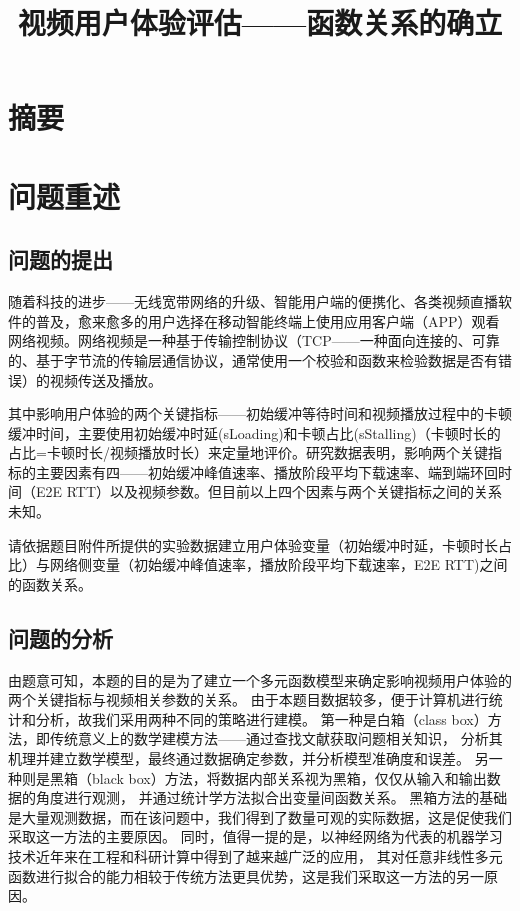 \documentclass[UTF8]{ctexart}
\title{视频用户体验评估——函数关系的确立}
\begin{document}
\maketitle
\section{摘要}
\section{问题重述}
\subsection{问题的提出}
随着科技的进步——无线宽带网络的升级、智能用户端的便携化、各类视频直播软件的普及，愈来愈多的用户选择在移动智能终端上使用应用客户端（APP）观看网络视频。网络视频是一种基于传输控制协议（TCP——一种面向连接的、可靠的、基于字节流的传输层通信协议，通常使用一个校验和函数来检验数据是否有错误）的视频传送及播放。

其中影响用户体验的两个关键指标——初始缓冲等待时间和视频播放过程中的卡顿缓冲时间，主要使用初始缓冲时延(sLoading)和卡顿占比(sStalling)（卡顿时长的占比=卡顿时长/视频播放时长）来定量地评价。研究数据表明，影响两个关键指标的主要因素有四——初始缓冲峰值速率、播放阶段平均下载速率、端到端环回时间（E2E RTT）以及视频参数。但目前以上四个因素与两个关键指标之间的关系未知。

请依据题目附件所提供的实验数据建立用户体验变量（初始缓冲时延，卡顿时长占比）与网络侧变量（初始缓冲峰值速率，播放阶段平均下载速率，E2E RTT)之间的函数关系。
\subsection{问题的分析}
由题意可知，本题的目的是为了建立一个多元函数模型来确定影响视频用户体验的两个关键指标与视频相关参数的关系。
由于本题目数据较多，便于计算机进行统计和分析，故我们采用两种不同的策略进行建模。
第一种是白箱（class box）方法，即传统意义上的数学建模方法——通过查找文献获取问题相关知识，
分析其机理并建立数学模型，最终通过数据确定参数，并分析模型准确度和误差。
另一种则是黑箱（black box）方法，将数据内部关系视为黑箱，仅仅从输入和输出数据的角度进行观测，
并通过统计学方法拟合出变量间函数关系。
黑箱方法的基础是大量观测数据，而在该问题中，我们得到了数量可观的实际数据，这是促使我们采取这一方法的主要原因。
同时，值得一提的是，以神经网络为代表的机器学习技术近年来在工程和科研计算中得到了越来越广泛的应用，
其对任意非线性多元函数进行拟合的能力相较于传统方法更具优势，这是我们采取这一方法的另一原因。
\end{document}
